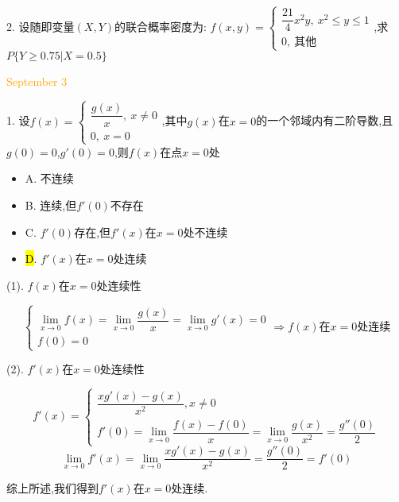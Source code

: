 2. 设随即变量$(X,Y)$的联合概率密度为:  $f(x,y)=\left\lbrace
\begin{array}{l}
	\dfrac{21}{4}x^2y,\ x^2\leq y\leq 1\\
	0,\ \text{其他}
\end{array}
\right. $,求$P\{Y\geq 0.75|X=0.5\}$
\begin{solution}
	
\end{solution}

\textcolor{orange}{September 3}

1. 设$f(x)=\left\lbrace
\begin{array}{l}
	\dfrac{g(x)}{x},\ x\neq 0\\
	0,\ x=0
\end{array}
\right. $,其中$g(x)$在$x=0$的一个邻域内有二阶导数,且$g(0)=0$,$g'(0)=0$,则$f(x)$在点$x=0$处
\begin{itemize}
	\item A. 不连续
	\item B. 连续,但$f'(0)$不存在
	\item C. $f'(0)$存在,但$f'(x)$在$x=0$处不连续
	\item \hl{D}. $f'(x)$在$x=0$处连续
\end{itemize}
\begin{solution}

	(1). $f(x)$在$x=0$处连续性
	
	$$\left\lbrace
	\begin{array}{l}
		\lim\limits_{x\to 0}f(x)=\lim\limits_{x\to 0}\dfrac{g(x)}{x}=\lim\limits_{x\to 0}g'(x)=0\\
		f(0)=0
	\end{array}
	\right. \Rightarrow f(x)\text{在}x=0\text{处连续}$$
	
	(2). $f'(x)$在$x=0$处连续性
	
	$$f'(x)=\left\lbrace
	\begin{array}{l}
		\dfrac{xg'(x)-g(x)}{x^2},x\neq 0\\
		f'(0)=\lim\limits_{x\to 0}\dfrac{f(x)-f(0)}{x}=\lim\limits_{x\to 0}\dfrac{g(x)}{x^2}=\dfrac{g''(0)}{2}
	\end{array}
	\right.$$
	$$\lim\limits_{x\to 0}f'(x)=\lim\limits_{x\to 0}\dfrac{xg'(x)-g(x)}{x^2}=\dfrac{g''(0)}{2}=f'(0)$$
	
	综上所述,我们得到$f'(x)$在$x=0$处连续.
\end{solution}

